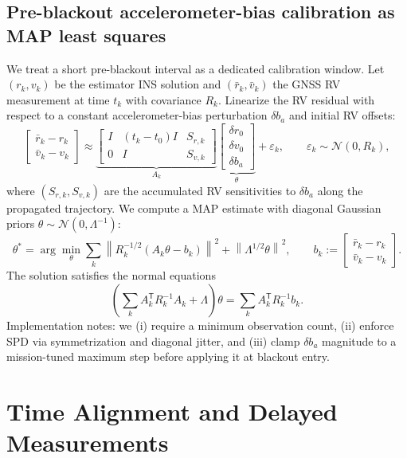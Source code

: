 \documentclass[10pt]{article}
\newcommand{\trans}{^{\mathsf T}}
\newcommand{\norm}[1]{\left\lVert #1 \right\rVert}
\newcommand{\calN}{\mathcal{N}}
\newcommand{\defeq}{\mathrel{:=}}
\begin{document}
\subsection{Pre-blackout accelerometer-bias calibration as MAP least squares}
We treat a short pre-blackout interval as a dedicated calibration window.
Let $(r_k,v_k)$ be the estimator INS solution and $(\bar r_k,\bar v_k)$ the GNSS RV measurement at time $t_k$ with covariance $R_k$.
Linearize the RV residual with respect to a constant accelerometer-bias perturbation $\delta b_a$ and initial RV offsets:
\begin{equation}
  \begin{bmatrix}\bar r_k - r_k\\ \bar v_k - v_k\end{bmatrix}
  \approx
  \underbrace{\begin{bmatrix}I & (t_k-t_0)I & S_{r,k}\\ 0 & I & S_{v,k}\end{bmatrix}}_{A_k}
  \underbrace{\begin{bmatrix}\delta r_0\\ \delta v_0\\ \delta b_a\end{bmatrix}}_{\theta}
  + \varepsilon_k,\qquad \varepsilon_k\sim\calN(0,R_k),
\end{equation}
where $(S_{r,k},S_{v,k})$ are the accumulated RV sensitivities to $\delta b_a$ along the propagated trajectory.
We compute a MAP estimate with diagonal Gaussian priors $\theta\sim\calN(0,\Lambda^{-1})$:
\begin{equation}
  \theta^\ast
  = \arg\min_{\theta}
  \sum_k \norm{R_k^{-1/2}(A_k\theta - b_k)}^2 + \norm{\Lambda^{1/2}\theta}^2,
  \qquad b_k \defeq \begin{bmatrix}\bar r_k - r_k\\ \bar v_k - v_k\end{bmatrix}.
\end{equation}
The solution satisfies the normal equations
\begin{equation}
  \left(\sum_k A_k\trans R_k^{-1}A_k + \Lambda\right)\theta
  =
  \sum_k A_k\trans R_k^{-1} b_k.
\end{equation}
Implementation notes: we (i) require a minimum observation count, (ii) enforce SPD via symmetrization and diagonal jitter, and (iii) clamp $\delta b_a$ magnitude
to a mission-tuned maximum step before applying it at blackout entry.

\section{Time Alignment and Delayed Measurements}
\end{document}
